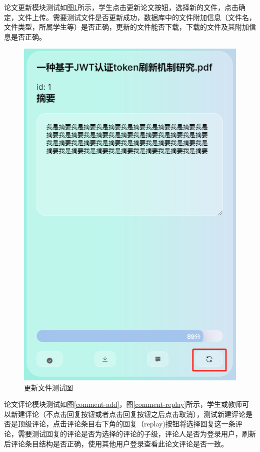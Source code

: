 论文更新模块测试如图\ref{file-refresh-test}所示，学生点击更新论文按钮，选择新的文件，点击确定，文件上传。需要测试文件是否更新成功，数据库中的文件附加信息（文件名，文件类型，所属学生等）是否正确，更新的文件能否下载，下载的文件及其附加信息是否正确。

\begin{figure}[htbp]
  \centering
  \includegraphics[scale = 0.6]{out/figure/测试/file-refresh-test.png}
  \caption{\song\wuhao 更新文件测试图}
  \label{file-refresh-test}
\end{figure}

论文评论模块测试如图\ref{comment-add}，图\ref{comment-replay}所示，学生或教师可以新建评论（不点击回复按钮或者点击回复按钮之后点击取消），测试新建评论是否是顶级评论，点击评论条目右下角的回复（replay)按钮将选择回复这一条评论，需要测试回复的评论是否为选择的评论的子级，评论人是否为登录用户，刷新后评论条目结构是否正确，使用其他用户登录查看此论文评论是否一致。

